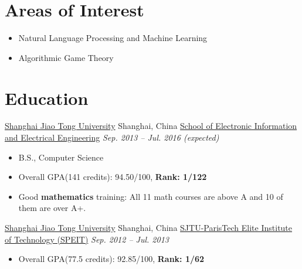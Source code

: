 \documentclass[letterpaper,12pt]{resume}
\author{Xinya Du}
\begin{document}
\resumeheader



\section{Areas of Interest}

\begin{itemize}
\item Natural Language Processing and Machine Learning
\item Algorithmic Game Theory%
\end {itemize}



\section{Education}
\begin{itemize}
   \credential
    {\href{http://en.sjtu.edu.cn/}{Shanghai Jiao Tong University}}
    {Shanghai, China}
    {\href{http://english.seiee.sjtu.edu.cn/}{School of Electronic Information and Electrical Engineering}}
    {\textit{Sep. 2013 -- Jul. 2016 (expected)}}
    { 
    \begin{itemize}
      \item{B.S., Computer Science}%
      \item{Overall GPA(141 credits): 94.50/100, \textbf{Rank: 1/122}}
      \item{Good \textbf{mathematics} training: All 11 math courses are above A and 10 of them are over A+.}
      \end{itemize}
    }
     \credential
    {\href{http://en.sjtu.edu.cn/}{Shanghai Jiao Tong University}}
   {Shanghai, China}
    {\href{http://speit.sjtu.edu.cn/indexen.html}{SJTU-ParisTech Elite Institute of Technology (SPEIT)}}
    {\textit{Sep. 2012 -- Jul. 2013}}
    { 
    \begin{itemize}
      \item{Overall GPA(77.5 credits): 92.85/100, \textbf{Rank: 1/62}}
      \end{itemize}
    }
\end{itemize}
\end{document}
